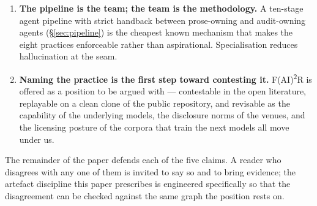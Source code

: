\begin{enumerate}[leftmargin=1.6em,itemsep=2pt,topsep=4pt]
        documented, insufficient.
  \item \textbf{The pipeline is the team; the team is the
        methodology.} A ten-stage agent pipeline with strict handback
        between prose-owning and audit-owning agents
        (\S\ref{sec:pipeline}) is the cheapest known mechanism that
        makes the eight practices enforceable rather than aspirational.
        Specialisation reduces hallucination at the seam.
  \item \textbf{Naming the practice is the first step toward
        contesting it.} F(AI)\textsuperscript{2}R is offered as a
        position to be argued with --- contestable in the open
        literature, replayable on a clean clone of the public
        repository, and revisable as the capability of the underlying
        models, the disclosure norms of the venues, and the licensing
        posture of the corpora that train the next models all move
        under us.
\end{enumerate}

\noindent The remainder of the paper defends each of the five
claims. A reader who disagrees with any one of them is invited to
say so and to bring evidence; the artefact discipline this paper
prescribes is engineered specifically so that the disagreement can
be checked against the same graph the position rests on.
